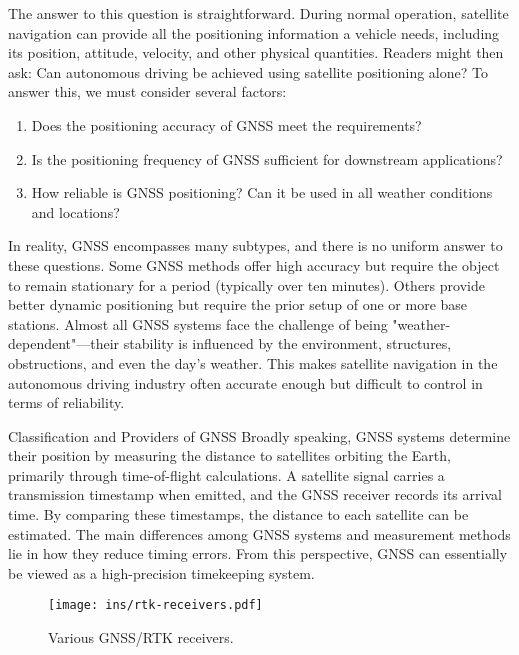 The answer to this question is straightforward. During normal operation, satellite navigation can provide all the positioning information a vehicle needs, including its position, attitude, velocity, and other physical quantities. Readers might then ask: Can autonomous driving be achieved using satellite positioning alone? To answer this, we must consider several factors:

\begin{enumerate}
	\item Does the positioning accuracy of GNSS meet the requirements?
	
	\item Is the positioning frequency of GNSS sufficient for downstream applications?
	
	\item How reliable is GNSS positioning? Can it be used in all weather conditions and locations?
	
\end{enumerate}

In reality, GNSS encompasses many subtypes, and there is no uniform answer to these questions. Some GNSS methods offer high accuracy but require the object to remain stationary for a period (typically over ten minutes). Others provide better dynamic positioning but require the prior setup of one or more base stations. Almost all GNSS systems face the challenge of being "weather-dependent"—their stability is influenced by the environment, structures, obstructions, and even the day's weather. This makes satellite navigation in the autonomous driving industry often accurate enough but difficult to control in terms of reliability.

Classification and Providers of GNSS
Broadly speaking, GNSS systems determine their position by measuring the distance to satellites orbiting the Earth, primarily through time-of-flight calculations. A satellite signal carries a transmission timestamp when emitted, and the GNSS receiver records its arrival time. By comparing these timestamps, the distance to each satellite can be estimated. The main differences among GNSS systems and measurement methods lie in how they reduce timing errors. From this perspective, GNSS can essentially be viewed as a high-precision timekeeping system.

\begin{figure}
	\centering
	\texttt{[image: ins/rtk-receivers.pdf]}
	\caption{Various GNSS/RTK receivers.}
	\label{fig:rtk-receivers}
\end{figure}

